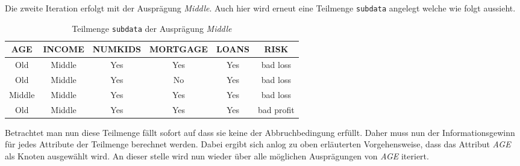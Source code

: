 Die zweite Iteration erfolgt mit der Ausprägung \textit{Middle}. Auch hier wird erneut eine Teilmenge \texttt{subdata} angelegt welche wie folgt aussieht.

\begin{table}[htbp]
    \centering
    \begin{tabularx}{\linewidth}{cccccc}
        \toprule
        \textbf{AGE} & \textbf{INCOME} & \textbf{NUMKIDS} & \textbf{MORTGAGE} & \textbf{LOANS} & \textbf{RISK} \\
        \toprule
        Old    & Middle    & Yes &     Yes &  Yes &   bad loss \\
        Old    & Middle    & Yes &     No  &  Yes &   bad loss \\
        Middle & Middle    & Yes &     Yes &  Yes &   bad loss \\
        Old    & Middle    & Yes &     Yes &  Yes & bad profit \\
        \bottomrule
    \end{tabularx}
    \caption{Teilmenge \texttt{subdata} der Ausprägung \textit{Middle}}
    \label{table:subdata-middle}
\end{table}

Betrachtet man nun diese Teilmenge fällt sofort auf dass sie keine der Abbruchbedingung erfüllt. Daher muss nun der Informationsgewinn für jedes Attribute der Teilmenge berechnet werden. Dabei ergibt sich anlog zu oben erläuterten Vorgehensweise, dass das Attribut \textit{AGE} als Knoten ausgewählt wird. An dieser stelle wird nun wieder über alle möglichen Ausprägungen von \textit{AGE} iteriert.